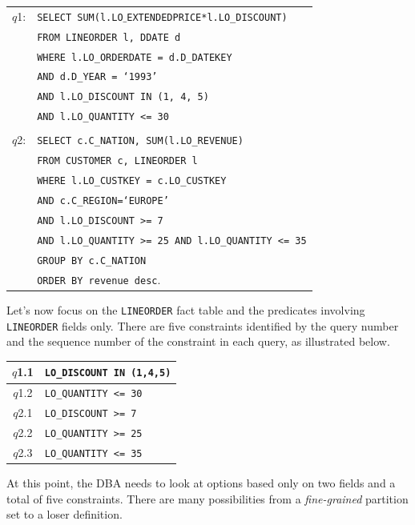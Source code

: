 \documentclass[paper]{ieice}
\begin{document}
\begin{center}
{\small
\begin{tabular}{rl}
$q$1:	& {\tt SELECT SUM(l.LO$\_$EXTENDEDPRICE*l.LO\_DISCOUNT)} \\ 
		& {\tt FROM LINEORDER l, DDATE d} \\
		& {\tt WHERE l.LO\_ORDERDATE = d.D\_DATEKEY} \\
		& {\tt AND d.D\_YEAR = `1993'} \\
		& {\tt AND l.LO\_DISCOUNT IN (1, 4, 5)} \\
        & {\tt AND l.LO\_QUANTITY <= 30} \\ 
		&								   \\	        
$q$2:	& {\tt SELECT c.C\_NATION, SUM(l.LO\_REVENUE)} \\ 
		& {\tt FROM CUSTOMER c, LINEORDER l} \\
		& {\tt WHERE l.LO\_CUSTKEY = c.LO\_CUSTKEY} \\
		& {\tt AND c.C\_REGION=`EUROPE'} \\
		& {\tt AND l.LO\_DISCOUNT >= 7} \\
		& {\tt AND l.LO\_QUANTITY >= 25 AND l.LO\_QUANTITY <= 35} \\
		& {\tt GROUP BY c.C\_NATION} \\
		& {\tt ORDER BY revenue desc}. \\
\end{tabular}
}
\end{center}

Let's now focus on the {\tt LINEORDER} fact table and 
the predicates involving {\tt LINEORDER} fields only. 
There are five constraints identified by the query number 
and the sequence number of the constraint in each query, as illustrated below.
\begin{center}
\begin{tabular}{|c|l|}\hline 
$q$1.1 & {\tt LO\_DISCOUNT IN (1,4,5)} \\ \hline
$q$1.2 & {\tt LO\_QUANTITY <= 30} \\ \hline
$q$2.1 & {\tt LO\_DISCOUNT >= 7} \\ \hline
$q$2.2 & {\tt LO\_QUANTITY >= 25}\\ \hline
$q$2.3 & {\tt LO\_QUANTITY <= 35} \\ \hline 
\end{tabular}
\end{center}

At this point, the DBA needs to look at options 
based only on two fields and a total of five constraints. 
There are many possibilities from a {\em fine-grained} partition set 
to a loser definition. 
\end{document}
